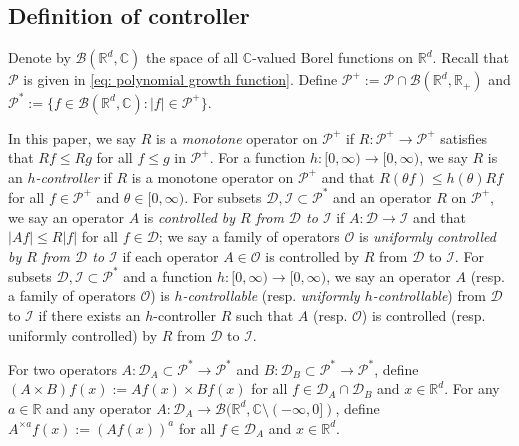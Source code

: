 \documentclass[EJP]{ejpecp} %
\begin{document}
\subsection{Definition of controller}
\label{sec: controller}
Denote by $\mathcal B(\mathbb R^d, \mathbb C)$ the space of all $\mathbb C$-valued Borel functions on $\mathbb R^d$.
Recall that $\mathcal P$ is given in \eqref{eq: polynomial growth function}.
Define $\mathcal P^+:= \mathcal P \cap \mathcal B(\mathbb R^d, \mathbb R_+)$ and $\mathcal P^*:= \{f\in \mathcal B(\mathbb R^d, \mathbb C): |f|\in \mathcal P^+\}$.

In this paper, we say $R$ is a \emph{monotone} operator on $\mathcal P^+$ if $R:\mathcal P^+ \to \mathcal P^+$ satisfies that $Rf\leq Rg$ for all $f\leq g$ in $\mathcal P^+$.
For a function $h: [0,\infty) \to [0,\infty)$, we say $R$ is an \emph{$h$-controller} if $R$ is a monotone operator on $\mathcal P^+$ and that $R(\theta f)\leq h(\theta) Rf$ for all $f\in \mathcal P^+$ and $\theta \in [0,\infty)$.
For subsets $\mathcal D, \mathcal I\subset \mathcal P^*$ and an operator $R$ on $\mathcal P^+$, we say an operator $A$ is \emph{controlled by $R$ from $\mathcal D$ to $\mathcal I$} if $A:\mathcal D \to \mathcal I$ and that $|Af| \leq R|f|$ for all $f\in \mathcal D$;
we say a family of operators $\mathscr O$ is \emph{uniformly controlled by $R$ from $\mathcal D$ to $\mathcal I$} if
each operator $A\in \mathscr O$  is controlled by $R$ from $\mathcal D$ to $\mathcal I$.
For subsets $\mathcal D, \mathcal I\subset \mathcal P^*$ and a function $h:[0,\infty) \to [0,\infty)$, we say an operator $A$ (resp. a family of operators $\mathscr O$) is \emph{$h$-controllable} (resp. \emph{uniformly $h$-controllable}) from $\mathcal D$ to $\mathcal I$ if there exists an $h$-controller $R$ such that $A$ (resp. $\mathscr O$) is controlled (resp. uniformly controlled) by $R$ from $\mathcal D$ to $\mathcal I$.

For two operators $A: \mathcal D_A \subset \mathcal P^*\to \mathcal P^*$ and $B: \mathcal D_B \subset \mathcal P^*\to \mathcal P^*$, define $(A \times B)f (x):= Af(x) \times Bf(x)$ for all $f\in \mathcal D_A \cap \mathcal D_B$ and $x\in \mathbb{R}^d$.
For any $a \in \mathbb R$ and any operator $A :\mathcal D_A \to \mathcal B(\mathbb R^d, \mathbb C\setminus (-\infty, 0])$, define $A^{\times a}f(x):= (Af(x))^a$ for all $f\in \mathcal D_A$ and $x\in \mathbb R^d$.
\end{document}
